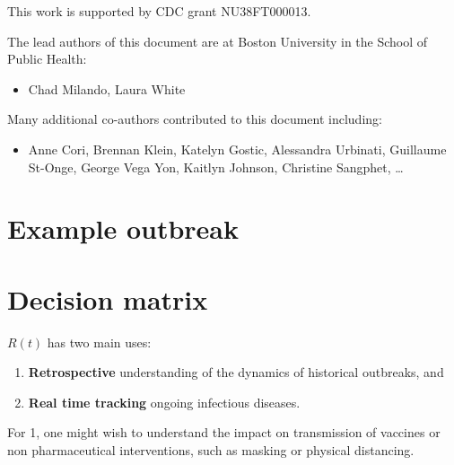 \documentclass[
  letterpaper,
  DIV=11,
  numbers=noendperiod]{scrreprt}
\providecommand{\tightlist}{%
  \setlength{\itemsep}{0pt}\setlength{\parskip}{0pt}}\usepackage{longtable,booktabs,array}
\begin{document}

This work is supported by CDC grant NU38FT000013.

The lead authors of this document are at Boston University in the School
of Public Health:

\begin{itemize}
\tightlist
\item
  Chad Milando, Laura White
\end{itemize}

Many additional co-authors contributed to this document including:

\begin{itemize}
\tightlist
\item
  Anne Cori, Brennan Klein, Katelyn Gostic, Alessandra Urbinati,
  Guillaume St-Onge, George Vega Yon, Kaitlyn Johnson, Christine
  Sangphet, \ldots{}
\end{itemize}


\chapter*{Example outbreak}\label{example-outbreak}



\chapter*{Decision matrix}\label{decision-matrix}


\(R(t)\) has two main uses:

\begin{enumerate}
\def\labelenumi{\arabic{enumi}.}
\tightlist
\item
  \textbf{Retrospective} understanding of the dynamics of historical
  outbreaks, and
\item
  \textbf{Real time tracking} ongoing infectious diseases.
\end{enumerate}

For 1, one might wish to understand the impact on transmission of
vaccines or non pharmaceutical interventions, such as masking or
physical distancing.
\end{document}
